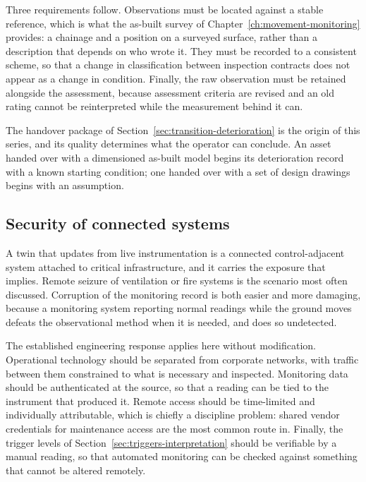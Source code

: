 Three requirements follow. Observations must be located against a stable
reference, which is what the as-built survey of
Chapter~\ref{ch:movement-monitoring} provides: a chainage and a position on
a surveyed surface, rather than a description that depends on who wrote it.
They must be recorded to a consistent scheme, so that a change in
classification between inspection contracts does not appear as a change in
condition. Finally, the raw observation must be retained alongside the assessment,
because assessment criteria are revised and an old rating cannot be
reinterpreted while the measurement behind it can.

The handover package of Section~\ref{sec:transition-deterioration} is the origin of
this series, and its quality determines what the operator can conclude.
An asset handed over with a dimensioned as-built model begins its
deterioration record with a known starting condition; one handed over with a
set of design drawings begins with an assumption.

\subsection{Security of connected systems}
\label{sec:cyber-security}

A twin that updates from live instrumentation is a connected control-adjacent
system attached to critical infrastructure, and it carries the exposure that
implies. Remote seizure of
ventilation or fire systems is the scenario most often discussed. Corruption of
the monitoring record is both easier and more damaging,
because a monitoring system reporting normal readings while the ground moves
defeats the observational method when it is needed, and does so
undetected.

The established engineering response applies here without modification.
Operational technology should be separated from corporate networks, with
traffic between them constrained to what is necessary and inspected.
Monitoring data should be authenticated at the source, so that a reading can
be tied to the instrument that produced it. Remote access should be
time-limited and individually attributable, which is chiefly a discipline
problem: shared vendor credentials for maintenance access are the most common
route in. Finally, the trigger levels of
Section~\ref{sec:triggers-interpretation} should be verifiable by
a manual reading, so that automated monitoring can be checked against
something that cannot be altered remotely.

